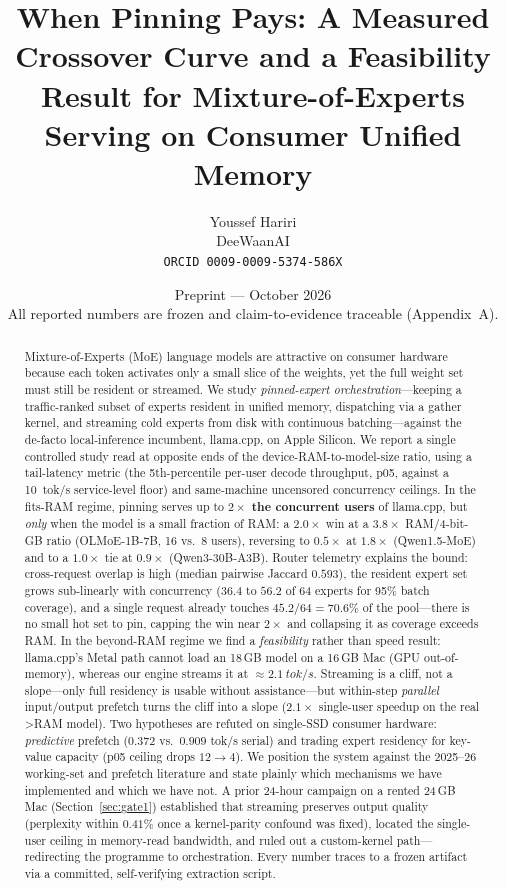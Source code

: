 \documentclass[11pt]{article}
\title{\textbf{When Pinning Pays: A Measured Crossover Curve and a Feasibility\\
Result for Mixture-of-Experts Serving on Consumer Unified Memory}}
\author{Youssef Hariri\\ DeeWaanAI\\ \texttt{ORCID 0009-0009-5374-586X}}
\date{Preprint --- October 2026\\ \small All reported numbers are frozen and claim-to-evidence traceable (Appendix~A).}
\newcommand{\ppl}{\ensuremath{\times}}
\begin{document}
\maketitle

\begin{abstract}
\noindent
Mixture-of-Experts (MoE) language models are attractive on consumer hardware because
each token activates only a small slice of the weights, yet the full weight set must
still be resident or streamed. We study \emph{pinned-expert orchestration}---keeping a
traffic-ranked subset of experts resident in unified memory, dispatching via a gather
kernel, and streaming cold experts from disk with continuous batching---against the
de-facto local-inference incumbent, llama.cpp, on Apple Silicon. We report a single
controlled study read at opposite ends of the device-RAM-to-model-size ratio, using a
tail-latency metric (the 5th-percentile per-user decode throughput, p05, against a
\SI{10}{tok/s} service-level floor) and same-machine uncensored concurrency ceilings.
In the fits-RAM regime, pinning serves up to \textbf{$2\ppl$ the concurrent users} of
llama.cpp, but \emph{only} when the model is a small fraction of RAM: a $2.0\ppl$ win at
a $3.8\ppl$ RAM/4-bit-GB ratio (OLMoE-1B-7B, 16 vs.\ 8 users), reversing to $0.5\ppl$ at
$1.8\ppl$ (Qwen1.5-MoE) and to a $1.0\ppl$ tie at $0.9\ppl$ (Qwen3-30B-A3B). Router
telemetry explains the bound: cross-request overlap is high (median pairwise Jaccard
$0.593$), the resident expert set grows sub-linearly with concurrency (36.4 to $56.2$ of
64 experts for 95\% batch coverage), and a single request already touches
$45.2/64=70.6\%$ of the pool---there is no small hot set to pin, capping the win near
$2\ppl$ and collapsing it as coverage exceeds RAM. In the beyond-RAM regime we find a
\emph{feasibility} rather than speed result: llama.cpp's Metal path cannot load an 18\,GB
model on a 16\,GB Mac (GPU out-of-memory), whereas our engine streams it at
${\approx}\SI{2.1}{tok/s}$. Streaming is a cliff, not a slope---only full residency is
usable without assistance---but within-step \emph{parallel} input/output prefetch turns
the cliff into a slope ($2.1\ppl$ single-user speedup on the real >RAM model). Two
hypotheses are refuted on single-SSD consumer hardware: \emph{predictive} prefetch
($0.372$ vs.\ $0.909$ tok/s serial) and trading expert residency for key-value capacity
(p05 ceiling drops $12\!\to\!4$). We position the system against the 2025--26
working-set and prefetch literature and state plainly which mechanisms we have
implemented and which we have not. A prior 24-hour campaign on a rented 24\,GB Mac
(Section~\ref{sec:gate1}) established that streaming preserves output quality (perplexity
within $0.41\%$ once a kernel-parity confound was fixed), located the single-user ceiling
in memory-read bandwidth, and ruled out a custom-kernel path---redirecting the programme
to orchestration. Every number traces to a frozen artifact via a
committed, self-verifying extraction script.
\end{abstract}
\end{document}
